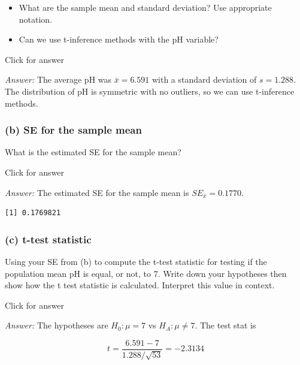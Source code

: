 \documentclass[
]{book}
\newenvironment{Shaded}{\begin{snugshade}}{\end{snugshade}}
\newcommand{\DecValTok}[1]{\textcolor[rgb]{0.00,0.00,0.81}{#1}}
\newcommand{\FunctionTok}[1]{\textcolor[rgb]{0.00,0.00,0.00}{#1}}
\newcommand{\NormalTok}[1]{#1}
\newcommand{\SpecialCharTok}[1]{\textcolor[rgb]{0.00,0.00,0.00}{#1}}
\providecommand{\tightlist}{%
  \setlength{\itemsep}{0pt}\setlength{\parskip}{0pt}}
\begin{document}
\begin{itemize}
\tightlist
\item
  What are the sample mean and standard deviation? Use appropriate notation.
\item
  Can we use t-inference methods with the pH variable?
\end{itemize}

Click for answer

\emph{Answer:} The average pH was \(\bar{x} = 6.591\) with a standard deviation of \(s=1.288\). The distribution of pH is symmetric with no outliers, so we can use t-inference methods.

\hypertarget{b-se-for-the-sample-mean}{%
\subsubsection{(b) SE for the sample mean}\label{b-se-for-the-sample-mean}}

What is the estimated SE for the sample mean?

Click for answer

\emph{Answer:} The estimated SE for the sample mean is \(SE_{\bar{x}} = 0.1770\).

\begin{Shaded}
\end{Shaded}

\begin{verbatim}
[1] 0.1769821
\end{verbatim}

\hypertarget{c-t-test-statistic}{%
\subsubsection{(c) t-test statistic}\label{c-t-test-statistic}}

Using your SE from (b) to compute the t-test statistic for testing if the population mean pH is equal, or not, to 7. Write down your hypotheses then show how the t test statistic is calculated. Interpret this value in context.

Click for answer

\emph{Answer:} The hypotheses are \(H_0: \mu = 7\) vs \(H_A: \mu \neq 7\). The test stat is

\[
t = \dfrac{6.591 - 7}{1.288/\sqrt{53}} = -2.3134
\]
\end{document}
